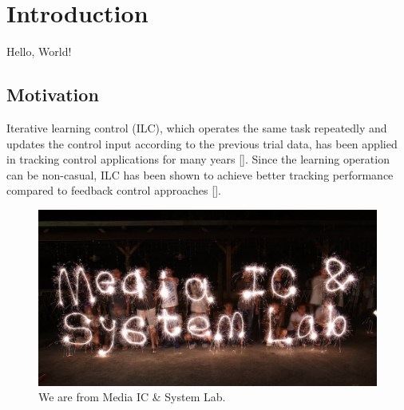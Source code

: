 \chapter{Introduction}
\label{ch:intro}
Hello, World!

\section{Motivation}
\label{sec:Motivation}
Iterative learning control (ILC), which operates the same task repeatedly and updates the control input according to the previous trial data, has been applied in tracking control applications for many years [\cite{ahn2007iterative}]. Since the learning operation can be non-casual, ILC has been shown to achieve better tracking performance compared to feedback control approaches [\cite{bristow2006survey}]. 


\begin{figure}
\begin{center}
\includegraphics[width=0.8\linewidth]{inc/1_introduction/figure/misl.jpg}
\end{center}
\caption{
We are from Media IC \& System Lab.
}
\label{fig:misl}
\end{figure}


%


